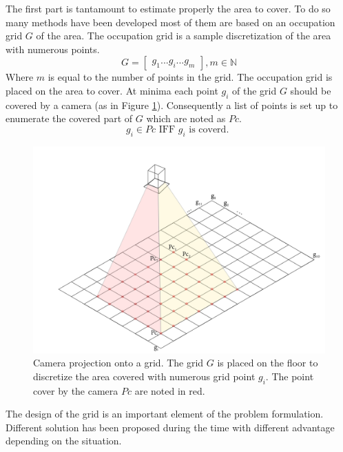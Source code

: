 
The first part is tantamount to estimate properly the area to cover. To do so many methods have been developed most of them are based on an occupation grid $G$ of the area. The occupation grid  is a sample discretization of the area with numerous points.
\begin{equation}\label{eq:Grid}
	G=\begin{bmatrix}
	 	g_1 ...g_i ... g_m
	\end{bmatrix}  , m\in \mathbb{N}
\end{equation}
Where $m$ is equal to the number of points in the grid.
The occupation grid is placed on the area to cover. At minima each point $g_i$ of the grid $G$ should be covered by a camera (as in Figure \ref{fig:cam_projOnGrid}). Consequently a list of points is set up to enumerate the covered part of $G$ which are noted as $Pc$.
\begin{equation}\label{eq:Pci}
g_i \in Pc \mbox{ IFF } g_i \mbox{ is coverd. }
\end{equation}

\begin{figure}[t!]
		\centering
  		\includegraphics[width=\linewidth]{img/CamProjectOnGrid.png}
  
 	 	\endminipage\hfill\caption{Camera projection onto a grid. The grid $G$ is placed on the floor to discretize the area covered with numerous grid point $g_i$. The point cover by the camera $Pc$ are noted in red.}\label{fig:cam_projOnGrid}
\end{figure}
The design of the grid is an important element of the problem formulation. Different solution has been proposed during the time with different advantage depending on the situation.\\

